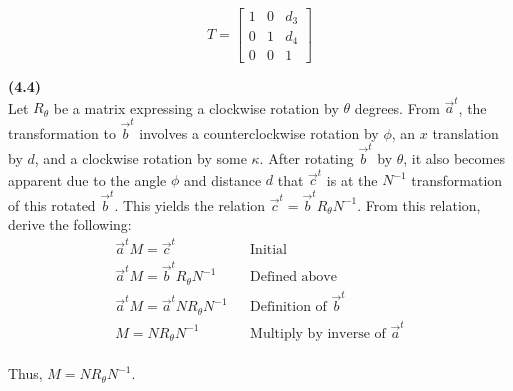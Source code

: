 \documentclass[letterpaper, 11pt]{article}
\newcommand{\fr}[1]{\vec{#1}^t}
\begin{document}
$$T = \begin{bmatrix}
  1 & 0 & d_3 \\
  0 & 1 & d_4 \\ 
  0 & 0 & 1
\end{bmatrix}$$

\newpage
\noindent \textbf{(4.4)} \\
Let $R_{\theta}$ be a matrix expressing a clockwise rotation by $\theta$ degrees. 
From $\fr{a}$, the transformation to $\fr{b}$ involves a counterclockwise rotation by $\phi$, an $x$ translation by $d$, and a clockwise rotation by some $\kappa$. After rotating $\fr{b}$ by $\theta$, it also becomes apparent due to the angle $\phi$ and distance $d$ that $\fr{c}$ is at the $N^{-1}$ transformation of this rotated $\fr{b}$. This yields the relation $\fr{c} = \fr{b} R_{\theta} N^{-1}$. From this relation, derive the following: 
\begin{align*}
    && \fr{a}M = \fr{c} && \text{Initial} && \\
    && \fr{a}M = \fr{b} R_{\theta} N^{-1} && \text{Defined above} && \\
    && \fr{a}M = \fr{a} N R_{\theta} N^{-1} && \text{Definition of $\fr{b}$} && \\
    && M = N R_{\theta} N^{-1} && \text{Multiply by inverse of $\fr{a}$} && \\
\end{align*} 

Thus, $M = N R_{\theta} N^{-1}$.
\end{document}
